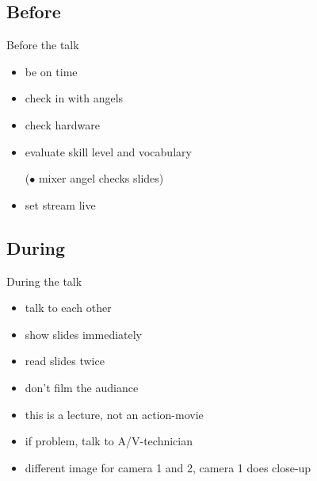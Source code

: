 \documentclass[hyperref={pdfpagelabels=false},aspectratio=169]{beamer}
\begin{document}
\subsection{Before}
\begin{frame}{Before the talk}
\begin{itemize} %
\item be on time %
\item check in with angels %
\item check hardware %
\item evaluate skill level and vocabulary %
\item [($\bullet$] mixer angel checks slides) %
\item set stream live %
\end{itemize} 
\end{frame}

\subsection{During} %
\begin{frame}{During the talk}
\begin{itemize}
\item talk to each other %
\item show slides immediately
\item read slides twice
\item don't film the audiance
\item this is a lecture, not an action-movie 
\item if problem, talk to A/V-technician
\item different image for camera 1 and 2, camera 1 does close-up
\end{itemize} 
\end{frame}
\end{document}
